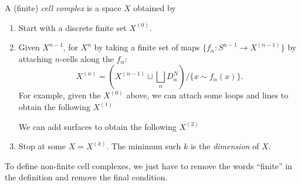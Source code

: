 \documentclass[a4paper]{article}
\begin{document}
\begin{defi}
  A (finite) \emph{cell complex} is a space $X$ obtained by
  \begin{enumerate}
    \item Start with a discrete finite set $X^{(0)}$.
      \begin{center}
      \end{center}
    \item Given $X^{n - 1}$, for $X^n$ by taking a finite set of maps $\{f_\alpha: S^{n - 1} \to X^{(n - 1)}\}$ by attaching $n$-cells along the $f_\alpha$:
      \[
        X^{(n)} = \left(X^{(n - 1)}\sqcup \bigsqcup_\alpha D_{\alpha}^N\right)/\{x\sim f_\alpha(x)\}.
      \]
      For example, given the $X^{(0)}$ above, we can attach some loops and lines to obtain the following $X^{(1)}$
      \begin{center}
      \end{center}
      We can add surfaces to obtain the following $X^{(2)}$
      \begin{center}
      \end{center}
    \item Stop at some $X = X^{(k)}$. The minimum such $k$ is the \emph{dimension} of $X$.
  \end{enumerate}
  To define non-finite cell complexes, we just have to remove the words ``finite'' in the definition and remove the final condition.
\end{defi}
\end{document}
